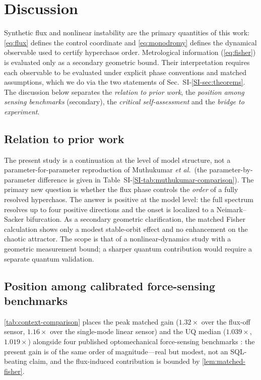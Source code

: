 \documentclass[Phys]{SciPost}
\begin{document}
\section{Discussion}

Synthetic flux and nonlinear instability are the primary quantities of this work: \cref{eq:flux} defines the control coordinate and \cref{eq:monodromy} defines the dynamical observable used to certify hyperchaos order. Metrological information (\cref{eq:fisher}) is evaluated only as a secondary geometric bound. Their interpretation requires each observable to be evaluated under explicit phase conventions and matched assumptions, which we do via the two statements of Sec.~SI-\ref{SI-sec:theorems}. The discussion below separates the \emph{relation to prior work}, the \emph{position among sensing benchmarks} (secondary), the \emph{critical self-assessment} and the \emph{bridge to experiment}.

\subsection{Relation to prior work}

The present study is a continuation at the level of model structure, not a parameter-for-parameter reproduction of Muthukumar \emph{et al.}~(the parameter-by-parameter difference is given in Table~SI-\ref{SI-tab:muthukumar-comparison}). The primary new question is whether the flux phase controls the \emph{order} of a fully resolved hyperchaos. The answer is positive at the model level: the full spectrum resolves up to four positive directions and the onset is localized to a Neimark--Sacker bifurcation. As a secondary geometric clarification, the matched Fisher calculation shows only a modest stable-orbit effect and no enhancement on the chaotic attractor. The scope is that of a nonlinear-dynamics study with a geometric measurement bound; a sharper quantum contribution would require a separate quantum validation.

\subsection{Position among calibrated force-sensing benchmarks}
\label{sec:comparison}

\cref{tab:context-comparison} places the peak matched gain ($\num{1.32}\times$ over the flux-off sensor, $\num{1.16}\times$ over the single-mode linear sensor) and the UQ median ($\num{1.039}\times$, $\num{1.019}\times$) alongside four published optomechanical force-sensing benchmarks \cite{teufel2011,purdy2017,gavartin2012,li2021a,qvarfort2018}: the present gain is of the same order of magnitude---real but modest, not an SQL-beating claim, and the flux-induced contribution is bounded by \cref{lem:matched-fisher}.
\end{document}
